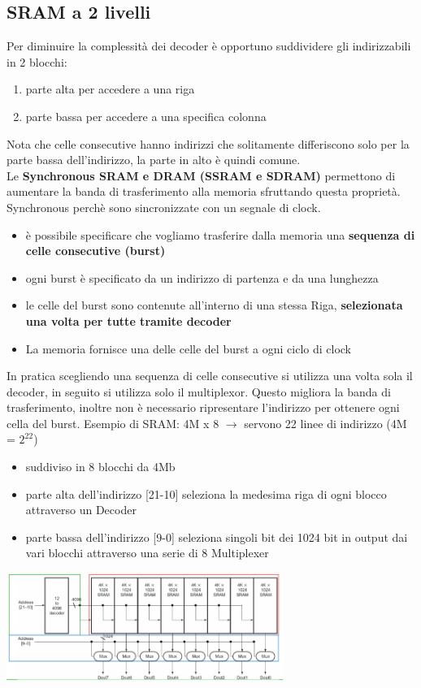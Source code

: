 \documentclass[12pt, a4paper, openany]{book}
\begin{document}
\subsection*{SRAM a 2 livelli}
Per diminuire la complessità dei decoder è opportuno suddividere gli indirizzabili
in 2 blocchi:
\begin{enumerate}
    \item parte alta per accedere a una riga
    \item parte bassa per accedere a una specifica colonna
\end{enumerate}
Nota che celle consecutive hanno indirizzi che solitamente differiscono solo per 
la parte bassa dell'indirizzo, la parte in alto è quindi comune.
\\ Le \textbf{Synchronous SRAM e DRAM (SSRAM e SDRAM)} permettono di aumentare la banda
di trasferimento alla memoria sfruttando questa proprietà.
\\ Synchronous perchè sono sincronizzate con un segnale di clock.
\begin{itemize}
    \item è possibile specificare che vogliamo trasferire dalla memoria
    una \textbf{sequenza di celle consecutive (burst)}
    \item ogni burst è specificato da un indirizzo di partenza e da una lunghezza
    \item le celle del burst sono contenute all'interno di una stessa Riga,
    \textbf{selezionata una volta per tutte tramite decoder}
    \item La memoria fornisce una delle celle del burst a ogni ciclo di clock 
\end{itemize}
In pratica scegliendo una sequenza di celle consecutive si utilizza una volta sola
il decoder, in seguito si utilizza solo il multiplexor. Questo migliora la banda di
trasferimento, inoltre non è necessario ripresentare l'indirizzo per ottenere ogni cella
del burst.
Esempio di SRAM: 4M x 8 $\to$ servono 22 linee di indirizzo (4M = $2^{22}$)
\begin{itemize}
    \item suddiviso in 8 blocchi da 4Mb
    \item parte alta dell'indirizzo [21-10] seleziona la medesima riga di ogni blocco
    attraverso un Decoder
    \item parte bassa dell'indirizzo [9-0] seleziona singoli bit dei 1024 bit in
    output dai vari blocchi attraverso una serie di 8 Multiplexer
\end{itemize}
\begin{center}
    \includegraphics[width=90mm, scale=0.5]{SRAM a 2 livelli.png}
\end{center}
\end{document}
